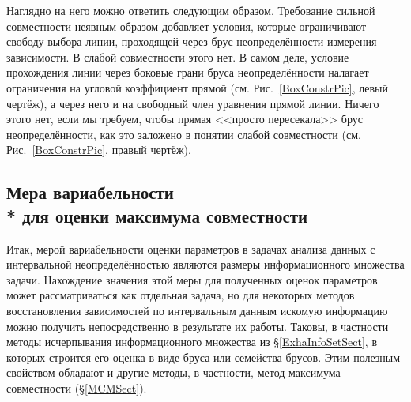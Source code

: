 \documentclass[a5paper,openany]{book}
\begin{document}
Наглядно на него можно ответить следующим образом. Требование сильной совместности 
неявным образом добавляет условия, которые ограничивают свободу выбора линии, проходящей 
через брус неопределённости измерения зависимости. В слабой совместности этого нет. 
В самом деле, условие прохождения линии через боковые грани бруса неопределённости 
налагает ограничения на угловой коэффициент прямой (см. Рис.~\ref{BoxConstrPic}, левый 
чертёж), а через него и на свободный член уравнения прямой линии. Ничего этого нет, 
если мы требуем, чтобы прямая <<просто пересекала>> брус неопределённости, как это 
заложено в понятии слабой совместности (см. Рис.~\ref{BoxConstrPic}, правый чертёж). 
  
  
  
\subsection[Вариабельность оценки максимума совместности]%
           {Мера вариабельности\\*  для оценки максимума совместности} 
\label{SrongCmptVarSect}   
  
Итак, мерой вариабельности оценки параметров в задачах анализа данных с интервальной 
неопределённостью являются размеры информационного множества задачи. Нахождение значения 
этой меры для полученных оценок параметров может рассматриваться как отдельная задача, 
но для некоторых методов восстановления зависимостей по интервальным данным искомую 
информацию можно получить непосредственно в результате их работы. Таковы, в частности 
методы исчерпывания информационного множества из \S\ref{ExhaInfoSetSect}, в которых 
строится его оценка в виде бруса или семейства брусов. Этим полезным свойством обладают 
и другие методы, в частности, метод максимума совместности (\S\ref{MCMSect}). 
  
\end{document}
